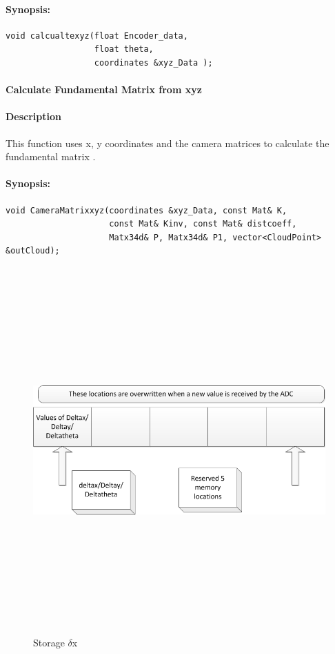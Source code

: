 \paragraph{Synopsis:}
\begin{lstlisting}
void calcualtexyz(float Encoder_data, 
				  float theta, 
				  coordinates &xyz_Data );
\end{lstlisting}

\paragraph{ Calculate Fundamental Matrix from xyz}
\paragraph{Description}
This function uses x, y coordinates and the camera matrices to calculate the fundamental matrix .
\paragraph{Synopsis:}
\begin{lstlisting}
void CameraMatrixxyz(coordinates &xyz_Data, const Mat& K, 
					 const Mat& Kinv, const Mat& distcoeff,
					 Matx34d& P, Matx34d& P1, vector<CloudPoint> &outCloud); 
\end{lstlisting}
   \begin{figure}[h]
    \centering
    \includegraphics[width=14cm,height=14cm,keepaspectratio]{Pictures/deltax}
    \caption{Storage $\delta$x}
    \label{fig:deltax}
	\end{figure}

